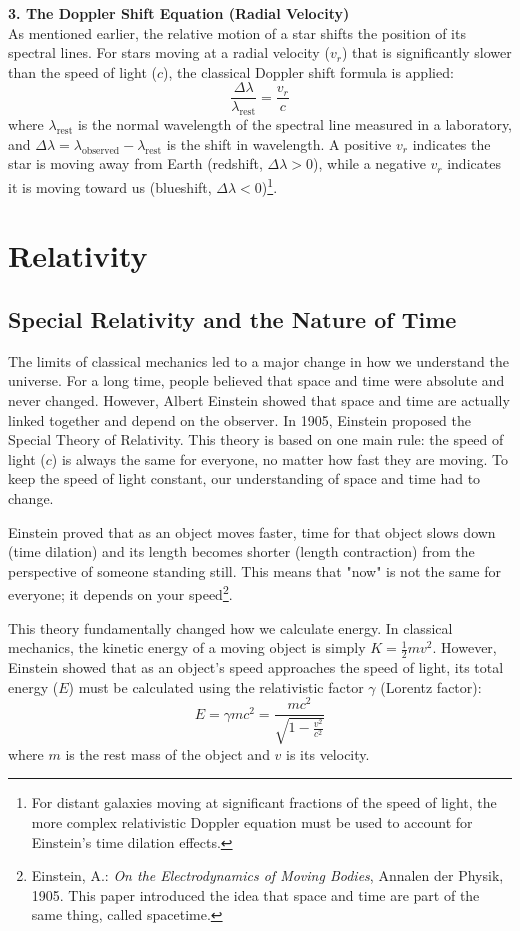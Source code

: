 \documentclass[10pt,a4paper]{article}
\begin{document}
\textbf{3. The Doppler Shift Equation (Radial Velocity)} \\
As mentioned earlier, the relative motion of a star shifts the position of its spectral lines. For stars moving at a radial velocity ($v_r$) that is significantly slower than the speed of light ($c$), the classical Doppler shift formula is applied:
$$\frac{\Delta \lambda}{\lambda_{\text{rest}}} = \frac{v_r}{c}$$
where $\lambda_{\text{rest}}$ is the normal wavelength of the spectral line measured in a laboratory, and $\Delta \lambda = \lambda_{\text{observed}} - \lambda_{\text{rest}}$ is the shift in wavelength. A positive $v_r$ indicates the star is moving away from Earth (redshift, $\Delta \lambda > 0$), while a negative $v_r$ indicates it is moving toward us (blueshift, $\Delta \lambda < 0$)\footnote{For distant galaxies moving at significant fractions of the speed of light, the more complex relativistic Doppler equation must be used to account for Einstein's time dilation effects.}.

\section{Relativity}

\subsection{Special Relativity and the Nature of Time}
The limits of classical mechanics led to a major change in how we understand the universe. For a long time, people believed that space and time were absolute and never changed. However, Albert Einstein showed that space and time are actually linked together and depend on the observer. In 1905, Einstein proposed the Special Theory of Relativity. This theory is based on one main rule: the speed of light ($c$) is always the same for everyone, no matter how fast they are moving. To keep the speed of light constant, our understanding of space and time had to change.

Einstein proved that as an object moves faster, time for that object slows down (time dilation) and its length becomes shorter (length contraction) from the perspective of someone standing still. This means that "now" is not the same for everyone; it depends on your speed\footnote{Einstein, A.: \textit{On the Electrodynamics of Moving Bodies}, Annalen der Physik, 1905. This paper introduced the idea that space and time are part of the same thing, called spacetime.}.

This theory fundamentally changed how we calculate energy. In classical mechanics, the kinetic energy of a moving object is simply $K = \frac{1}{2}mv^2$. However, Einstein showed that as an object's speed approaches the speed of light, its total energy ($E$) must be calculated using the relativistic factor $\gamma$ (Lorentz factor):
$$E = \gamma mc^2 = \frac{mc^2}{\sqrt{1 - \frac{v^2}{c^2}}}$$
where $m$ is the rest mass of the object and $v$ is its velocity.
\end{document}

